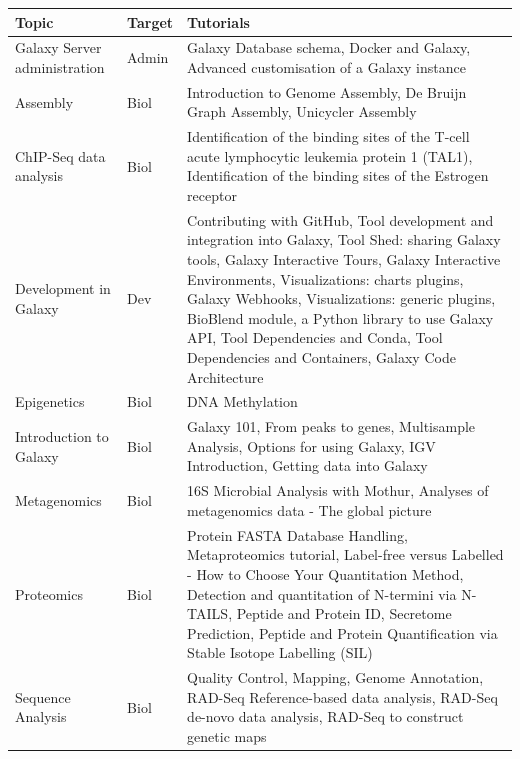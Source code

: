 \begin{table}{}
    \begin{tabular}{llp{10cm}}
    \hline
    \textbf{Topic} & \textbf{Target} & \textbf{Tutorials} \\
    \hline
    Galaxy Server administration &  Admin & Galaxy Database schema, Docker and Galaxy, Advanced customisation of a Galaxy instance \\

    Assembly &  Biol & Introduction to Genome Assembly, De Bruijn Graph Assembly, Unicycler Assembly \\

    ChIP-Seq data analysis & Biol &  Identification of the binding sites of the T-cell acute lymphocytic leukemia protein 1 (TAL1), Identification of the binding sites of the Estrogen receptor \\

    Development in Galaxy &  Dev & Contributing with GitHub, Tool development and integration into Galaxy, Tool Shed: sharing Galaxy tools, Galaxy Interactive Tours, Galaxy Interactive Environments, Visualizations: charts plugins, Galaxy Webhooks, Visualizations: generic plugins, BioBlend module, a Python library to use Galaxy API, Tool Dependencies and Conda, Tool Dependencies and Containers, Galaxy Code Architecture \\

    Epigenetics & Biol & DNA Methylation \\

    Introduction to Galaxy & Biol & Galaxy 101, From peaks to genes, Multisample Analysis, Options for using Galaxy, IGV Introduction, Getting data into Galaxy \\

    Metagenomics & Biol & 16S Microbial Analysis with Mothur, Analyses of metagenomics data - The global picture \\

    Proteomics & Biol & Protein FASTA Database Handling, Metaproteomics tutorial, Label-free versus Labelled - How to Choose Your Quantitation Method, Detection and quantitation of N-termini via N-TAILS, Peptide and Protein ID, Secretome Prediction, Peptide and Protein Quantification via Stable Isotope Labelling (SIL) \\

    Sequence Analysis & Biol & Quality Control, Mapping, Genome Annotation, RAD-Seq Reference-based data analysis, RAD-Seq de-novo data analysis, RAD-Seq to construct genetic maps \\


\end{tabular}
\end{table}
